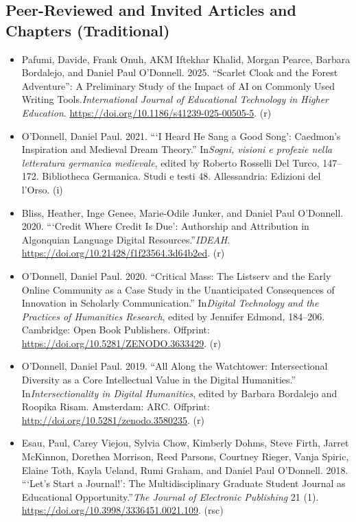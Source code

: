 \documentclass[12pt]{article}
\begin{document}
\subsection*{Peer-Reviewed and Invited Articles and Chapters (Traditional)}

\begin{itemize}
  \item Pafumi, Davide\*, Frank Onuh\*, AKM Iftekhar Khalid\*, Morgan Pearce\*, Barbara Bordalejo, and Daniel Paul O'Donnell. 2025. “Scarlet Cloak and the Forest Adventure”: A Preliminary Study of the Impact of AI on Commonly Used Writing Tools.\textit{International Journal of Educational Technology in Higher Education}. \url{https://doi.org/10.1186/s41239-025-00505-5}. (r)
  \item O’Donnell, Daniel Paul. 2021. “‘I Heard He Sang a Good Song’: Caedmon’s Inspiration and Medieval Dream Theory.” In\textit{Sogni, visioni e profezie nella letteratura germanica medievale}, edited by Roberto Rosselli Del Turco, 147–172. Bibliotheca Germanica. Studi e testi 48. Allessandria: Edizioni del l’Orso. (i)
  \item Bliss, Heather, Inge Genee, Marie-Odile Junker, and Daniel Paul O’Donnell. 2020. “‘Credit Where Credit Is Due’: Authorship and Attribution in Algonquian Language Digital Resources.”\textit{IDEAH}. \url{https://doi.org/10.21428/f1f23564.3d64b2ed}. (r)
  \item O’Donnell, Daniel Paul. 2020. “Critical Mass: The Listserv and the Early Online Community as a Case Study in the Unanticipated Consequences of Innovation in Scholarly Communication.” In\textit{Digital Technology and the Practices of Humanities Research}, edited by Jennifer Edmond, 184–206. Cambridge: Open Book Publishers. Offprint: \url{https://doi.org/10.5281/ZENODO.3633429}. (r)
  \item O’Donnell, Daniel Paul. 2019. “All Along the Watchtower: Intersectional Diversity as a Core Intellectual Value in the Digital Humanities.” In\textit{Intersectionality in Digital Humanities}, edited by Barbara Bordalejo and Roopika Risam. Amsterdam: ARC. Offprint: \url{http://doi.org/10.5281/zenodo.3580235}. (r)
  \item Esau, Paul\*, Carey Viejou\*, Sylvia Chow\*, Kimberly Dohms\*, Steve Firth\*, Jarret McKinnon\*, Dorethea Morrison\*, Reed Parsons\*, Courtney Rieger\*, Vanja Spiric\*, Elaine Toth\*, Kayla Ueland\*, Rumi Graham, and Daniel Paul O’Donnell. 2018. “‘Let’s Start a Journal!’: The Multidisciplinary Graduate Student Journal as Educational Opportunity.”\textit{The Journal of Electronic Publishing} 21 (1). \url{https://doi.org/10.3998/3336451.0021.109}. (rsc)

\end{itemize}
\end{document}
